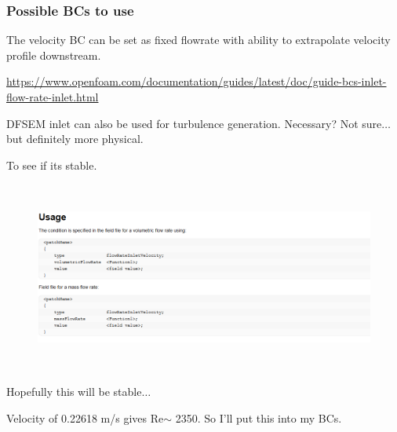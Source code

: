 \documentclass[12pt]{article}
\renewcommand{\_}{\kern-1.5pt\textunderscore\kern-1.5pt}
\begin{document}
\subsubsection{Possible BCs to use}
\vspace{\baselineskip}
The velocity BC can be set as fixed flowrate with ability to extrapolate velocity profile downstream.\par

\href{https://www.openfoam.com/documentation/guides/latest/doc/guide-bcs-inlet-flow-rate-inlet.html}{https://www.openfoam.com/documentation/guides/latest/doc/guide-bcs-inlet-flow-rate-inlet.html}\par



DFSEM inlet can also be used for turbulence generation. Necessary? Not sure$ \ldots $  but definitely more physical.\par

To see if its stable.\par




\begin{figure}[H]
	\begin{Center}
		\includegraphics[width=6.27in,height=2.46in]{./media/image26.png}
	\end{Center}
\end{figure}



\par

Hopefully this will be stable$ \ldots $ \par

Velocity of 0.22618 m/s gives Re$ \sim $ 2350. So I’ll put this into my BCs.\par
\end{document}
